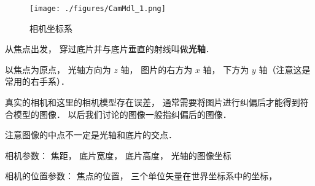
\begin{figure}[ht]
\centering
\texttt{[image: ./figures/CamMdl\_1.png]}
\caption{相机坐标系} \label{CamMdl_fig1}
\end{figure}

从焦点出发， 穿过底片并与底片垂直的射线叫做\textbf{光轴}．

以焦点为原点， 光轴方向为 $z$ 轴， 图片的右方为 $x$ 轴， 下方为 $y$ 轴（注意这是常用的右手系）．

真实的相机和这里的相机模型存在误差， 通常需要将图片进行纠偏后才能得到符合模型的图像． 以后我们讨论的图像一般指纠偏后的图像．

注意图像的中点不一定是光轴和底片的交点．

相机参数： 焦距， 底片宽度， 底片高度， 光轴的图像坐标

相机的位置参数： 焦点的位置， 三个单位矢量在世界坐标系中的坐标， 
